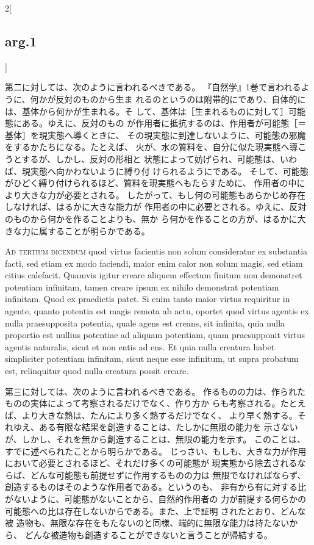 \documentclass[paper=a4paper,fontsize=10pt,jafontsize=9pt,titlepage]{jlreq}
\begin{document}
\begin{paracol}{2}[\subsection{arg.1}]
\switchcolumn

第二に対しては、次のように言われるべきである。
『自然学』1巻で言われるように、何かが反対のものから生ま
 れるのというのは附帯的にであり、自体的には、基体から何かが生まれる。そ
 して、基体は［生まれるものに対して］可能態にある。ゆえに、反対のもの
 が作用者に抵抗するのは、作用者が可能態［＝基体］を現実態へ導くときに、
 その現実態に到達しないように、可能態の邪魔をするかたちになる。たとえば、
 火が、水の質料を、自分に似た現実態へ導こうとするが、しかし、反対の形相と
 状態によって妨げられ、可能態は、いわば、現実態へ向かわないように縛り付
 けられるようにである。
そして、可能態がひどく縛り付けられるほど、質料を現実態へもたらすために、
 作用者の中により大きな力が必要とされる。
したがって、もし何の可能態もあらかじめ存在しなければ、はるかに大きな能力が
 作用者の中に必要とされる。ゆえに、反対のものから何かを作ることよりも、無か
 ら何かを作ることの方が、はるかに大きな力に属することが明らかである。

\switchcolumn*[\subsection{ad.3}]

{\scshape Ad tertium dicendum} quod virtus facientis non
 solum consideratur ex substantia facti, sed etiam ex modo faciendi,
 maior enim calor non solum magis, sed etiam citius calefacit. Quamvis
 igitur creare aliquem effectum finitum non demonstret potentiam
 infinitam, tamen creare ipsum ex nihilo demonstrat potentiam
 infinitam. Quod ex praedictis patet. Si enim tanto maior virtus
 requiritur in agente, quanto potentia est magis remota ab actu, oportet
 quod virtus agentis ex nulla praesupposita potentia, quale agens est
 creans, sit infinita, quia nulla proportio est nullius potentiae ad
 aliquam potentiam, quam praesupponit virtus agentis naturalis, sicut et
 non entis ad ens. Et quia nulla creatura habet simpliciter potentiam
 infinitam, sicut neque esse infinitum, ut supra probatum est,
 relinquitur quod nulla creatura possit creare.

\switchcolumn

第三に対しては、次のように言われるべきである。
作るものの力は、作られたものの実体によって考察されるだけでなく、作り方か
 らも考察される。たとえば、より大きな熱は、たんにより多く熱するだけでなく、
 より早く熱する。それゆえ、ある有限な結果を創造することは、たしかに無限の能力を
 示さないが、しかし、それを無から創造することは、無限の能力を示す。
このことは、すでに述べられたことから明らかである。
じっさい、もしも、大きな力が作用において必要とされるほど、それだけ多くの可能態が
 現実態から除去されるならば、どんな可能態も前提せずに作用するものの力は
 無限でなければならず、創造するものはそのような作用者である。というのも、
 非有から有に対する比がないように、可能態がないことから、自然的作用者の
 力が前提する何らかの可能態への比は存在しないからである。また、上で証明
 されたとおり、どんな被
 造物も、無限な存在をもたないのと同様、端的に無限な能力は持たないから、
 どんな被造物も創造することができないと言うことが帰結する。

\end{paracol}
\end{document}
